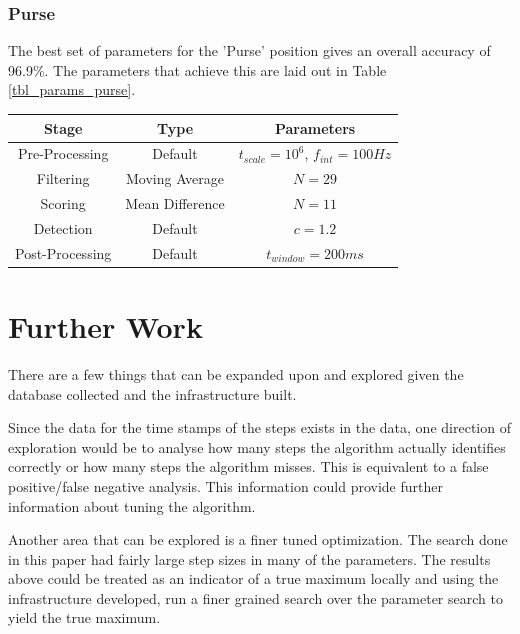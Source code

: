             \subsection{Purse}

                The best set of parameters for the 'Purse' position gives an overall accuracy of 96.9\%. The parameters that achieve this are laid out in Table \ref{tbl_params_purse}.

                \begin{center}
                    \label{tbl_params_purse}
                    \begin{tabular}{|c|c|c|}
                        \hline
                        Stage & Type & Parameters \\
                        \hline
                        Pre-Processing & Default & $t_{scale}=10^6$, $f_{int}=100Hz$ \\
                        Filtering & Moving Average & $N=29$ \\
                        Scoring & Mean Difference & $N=11$ \\
                        Detection & Default & $c=1.2$ \\
                        Post-Processing & Default & $t_{window}=200ms$ \\
                        \hline
                    \end{tabular}
                \end{center}    



    \chapter{Further Work}

        There are a few things that can be expanded upon and explored given the database collected and the infrastructure built. 

        Since the data for the time stamps of the steps exists in the data, one direction of exploration would be to analyse how many steps the algorithm actually identifies correctly or how many steps the algorithm misses. This is equivalent to a false positive/false negative analysis. This information could provide further information about tuning the algorithm. 

        Another area that can be explored is a finer tuned optimization. The search done in this paper had fairly large step sizes in many of the parameters. The results above could be treated as an indicator of a true maximum locally and using the infrastructure developed, run a finer grained search over the parameter search to yield the true maximum.